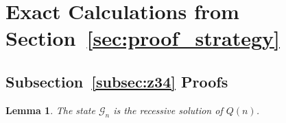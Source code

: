 \documentclass[oneside,english,11pt]{amsart}
\newtheorem{lemma}[thm]{Lemma}
\begin{document}
\clearpage


\section{Exact Calculations from Section~\ref{sec:proof_strategy}}
\label{Appendex: proof calculations}

\subsection{Subsection~\ref{subsec:z34} Proofs}
\label{app:zeta34-proof}

\begin{lemma}\label{lem:z34-recessive}\label{app:z34-recessive}
The state $\mathcal G_n$ is the recessive solution of $Q(n)$.
\end{lemma}
\end{document}
